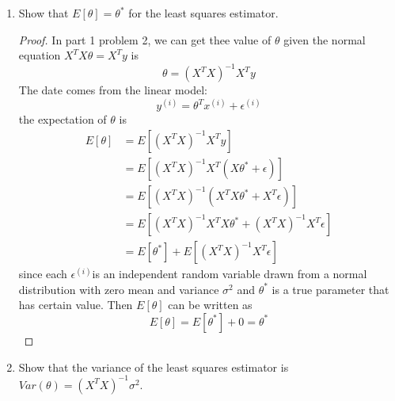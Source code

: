 \documentclass[]{book}
\theoremstyle{definition}
\begin{document}
\begin{enumerate}
	\item Show that $E[\theta]= \theta^*$ for the least squares estimator.
	
\begin{proof}
	In part 1 problem 2, we can get thee value of $\theta$ given the normal equation $X^T X \theta = X^T y$ is 
	$$\theta = (X^T X)^{-1} X^T y$$
	The date comes from the linear model:
	$$y^{(i)} = \theta^T x^{(i)} + \epsilon^{(i)} $$
	the expectation of $\theta$ is
	 \begin{equation*}
		\begin{split}
		E[\theta] &= E[(X^T X)^{-1} X^T y]\\
				 &= E[(X^T X)^{-1} X^T (X\theta^* + \epsilon)]\\
				 &=E[(X^T X)^{-1} (X^T X \theta^* +X^T \epsilon)]\\
				 &=E[(X^T X)^{-1}X^T X\theta^* + (X^T X)^{-1} X^T \epsilon]\\
				 &=E[\theta^*] +E[(X^T X)^{-1} X^T \epsilon]
		\end{split}
		\end{equation*}
	since each $\epsilon^{(i)}$is an independent random variable drawn from a normal distribution with zero mean and variance $\sigma^2$ and $\theta^*$ is a true parameter that has certain value. Then $E[\theta]$ can be written as
	$$E[\theta] = E[\theta^*] +0 = \theta^*$$
	
\end{proof}

	\item Show that the variance of the least squares estimator is $Var(\theta) = (X^T X)^{-1} \sigma^2$.
	

\end{enumerate}
\end{document}
